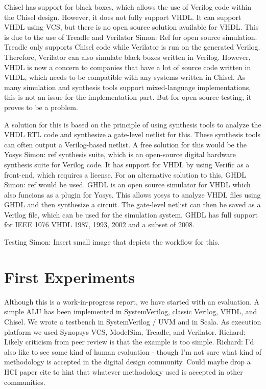 \documentclass[a4paper, conference]{IEEEtran}
\newcommand{\simon}[1]{{\color{green} Simon: #1}}
\newcommand{\ducky}[1]{{\color{orange} Richard: #1}}
\begin{document}
Chisel has support for black boxes, which allows the use of Verilog code within the Chisel design. However, it does not fully support VHDL. It can support VHDL using VCS, but there is no open source solution available for VHDL. This is due to the use of Treadle and Verilator \simon{Ref} for open source simulation. Treadle only supports Chisel code while Verilator is run on the generated Verilog. Therefore, Verilator can also simulate black boxes written in Verilog. However, VHDL is now a concern to companies that have a lot of source code written in VHDL, which needs to be compatible with any systems written in Chisel. As many simulation and synthesis tools support mixed-language implementations, this is not an issue for the implementation part. But for open source testing, it proves to be a problem.

A solution for this is based on the principle of using synthesis tools to analyze the VHDL RTL code and synthesize a gate-level netlist for this. These synthesis tools can often output a Verilog-based netlist. A free solution for this would be the Yosys \simon{ref} synthesis suite, which is an open-source digital hardware synthesis suite for Verilog code. It has support for VHDL by using Verific as a front-end, which requires a license. For an alternative solution to this, GHDL \simon{ref} would be used. GHDL is an open source simulator for VHDL which also funcions as a plugin for Yosys. This allows yosys to analyze VHDL files using GHDL and then synthesize a circuit. The gate-level netlist can then be saved as a Verilog file, which can be used for the simulation system. GHDL has full support for IEEE 1076 VHDL 1987, 1993, 2002 and a subset of 2008.

Testing
\simon{Insert small image that depicts the workflow for this.}

\section{First Experiments}

Although this is a work-in-progress report, we have started with an evaluation.
A simple ALU has been implemented in SystemVerilog, classic Verilog, VHDL, and Chisel.
We wrote a testbench in SystemVerilog / UVM and in Scala. As execution platform we used Synopsys VCS, ModelSim, Treadle, and Verilator.
\ducky{Likely criticism from peer review is that the example is too simple.}
\ducky{I'd also like to see some kind of human evaluation - though I'm not sure what kind of methodology is accepted in the digital design community. Could maybe drop a HCI paper cite to hint that whatever methodology used is accepted in other communities.}
\end{document}
